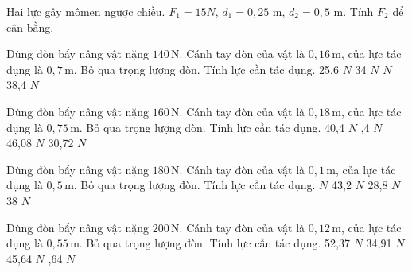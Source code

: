 \begin{bt}
Hai lực gây mômen ngược chiều. $F_1=15N$, $d_1=0,25$ m, $d_2=0,5$ m. Tính $F_2$ để cân bằng.
\end{bt}

\begin{ex}
Dùng đòn bẩy nâng vật nặng $140\,\text{N}$. Cánh tay đòn của vật là $0,16\,\text{m}$, của lực tác dụng là $0,7\,\text{m}$. Bỏ qua trọng lượng đòn. Tính lực cần tác dụng.
\choice
{25,6 $N$}
{34 $N$}
{ $N$}
{38,4 $N$}
\end{ex}

\begin{ex}
Dùng đòn bẩy nâng vật nặng $160\,\text{N}$. Cánh tay đòn của vật là $0,18\,\text{m}$, của lực tác dụng là $0,75\,\text{m}$. Bỏ qua trọng lượng đòn. Tính lực cần tác dụng.
\choice
{40,4 $N$}
{,4 $N$}
{46,08 $N$}
{30,72 $N$}
\end{ex}

\begin{ex}
Dùng đòn bẩy nâng vật nặng $180\,\text{N}$. Cánh tay đòn của vật là $0,1\,\text{m}$, của lực tác dụng là $0,5\,\text{m}$. Bỏ qua trọng lượng đòn. Tính lực cần tác dụng.
\choice
{ $N$}
{43,2 $N$}
{28,8 $N$}
{38 $N$}
\end{ex}

\begin{ex}
Dùng đòn bẩy nâng vật nặng $200\,\text{N}$. Cánh tay đòn của vật là $0,12\,\text{m}$, của lực tác dụng là $0,55\,\text{m}$. Bỏ qua trọng lượng đòn. Tính lực cần tác dụng.
\choice
{52,37 $N$}
{34,91 $N$}
{45,64 $N$}
{,64 $N$}
\end{ex}

